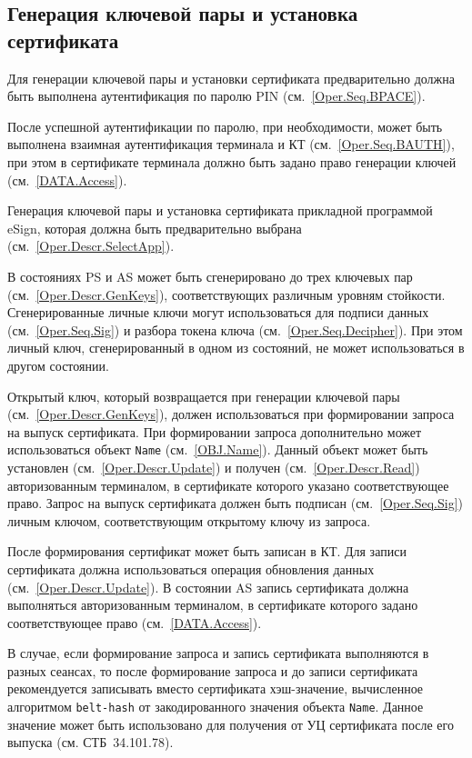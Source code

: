 \subsection{Генерация ключевой пары и установка сертификата}
\label{Oper.Seq.GeKeySetCert}

Для генерации ключевой пары и 
установки сертификата предварительно 
должна быть выполнена аутентификация по 
паролю PIN (см.~\ref{Oper.Seq.BPACE}).

После успешной аутентификации по паролю,
при необходимости, может быть выполнена взаимная 
аутентификация терминала и КТ (см.~\ref{Oper.Seq.BAUTH}),
при этом в сертификате терминала должно быть задано
право генерации ключей (см.~\ref{DATA.Access}).

Генерация ключевой пары и установка сертификата 
прикладной программой eSign, которая должна быть предварительно 
выбрана (см.~\ref{Oper.Descr.SelectApp}). 

В состояниях PS и AS может быть сгенерировано
до трех ключевых пар (см.~\ref{Oper.Descr.GenKeys}), 
соответствующих различным уровням стойкости. 
Сгенерированные личные ключи могут использоваться
для подписи данных (см.~\ref{Oper.Seq.Sig}) и разбора токена 
ключа (см.~\ref{Oper.Seq.Decipher}).
При этом личный ключ, сгенерированный в одном из состояний, 
не может использоваться в другом состоянии. 

Открытый ключ, который возвращается при генерации ключевой пары
(см.~\ref{Oper.Descr.GenKeys}), должен использоваться при формировании 
запроса на выпуск сертификата.
При формировании запроса дополнительно может использоваться 
объект \texttt{Name} (см.~\ref{OBJ.Name}). 
Данный объект может быть установлен (см.~\ref{Oper.Descr.Update}) 
и получен (см.~\ref{Oper.Descr.Read})
авторизованным терминалом, в сертификате которого указано 
соответствующее право.
\fi
Запрос на выпуск сертификата должен быть подписан (см.~\ref{Oper.Seq.Sig})
личным ключом, соответствующим открытому ключу из запроса.

После формирования сертификат может быть записан в КТ.
Для записи сертификата должна использоваться операция 
обновления данных (см.~\ref{Oper.Descr.Update}). 
В состоянии AS запись сертификата должна выполняться 
авторизованным терминалом, в сертификате которого задано 
соответствующее право (см.~\ref{DATA.Access}). 

В случае, если формирование запроса и запись сертификата
выполняются в разных сеансах, то 
после формирование запроса и до записи сертификата 
рекомендуется записывать вместо сертификата 
хэш-значение, вычисленное алгоритмом \texttt{belt-hash} 
от закодированного значения объекта \texttt{Name}.
Данное значение может быть использовано для получения от УЦ
сертификата после его выпуска (см. СТБ~34.101.78).

